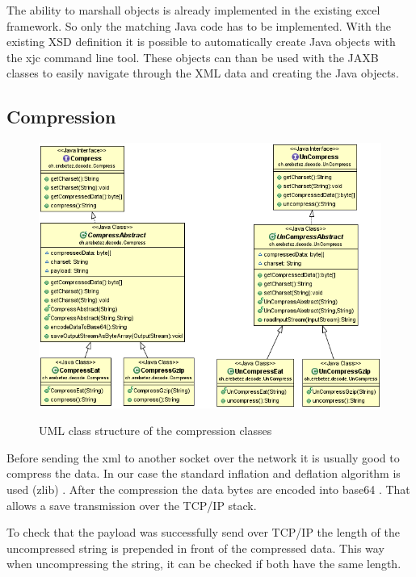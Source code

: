 \documentclass[paper=a4,twoside=false,BCOR=0mm,DIV=calc,fontsize=12pt]{scrartcl}
\begin{document}
The ability to marshall objects is already implemented in the existing excel framework. So only the matching Java code has to be implemented.
With the existing XSD definition it is possible to automatically create Java objects with the xjc \cite{xjc} command line tool.
These objects can than be used with the JAXB \cite{jaxb} classes to easily navigate through the XML data and creating the Java objects.



\subsection{Compression}
\begin{figure}
    \begin{center}
      \includegraphics[width=1\textwidth]{./img/uml_decode_model.png}\\
    \end{center}
  \caption{UML class structure of the compression classes}
  \label{compressionClassUml}
\end{figure} 

Before sending the xml to another socket over the network it is usually good to compress the data.
In our case the standard inflation and deflation algorithm is used (zlib) \cite{zlib}. After the compression 
the data bytes are encoded into base64 \cite{base64}. That allows a save transmission over the TCP/IP stack.

To check that the payload was successfully send over TCP/IP the length of the uncompressed string is prepended in front of the compressed data. This way when uncompressing the string, it can be checked if both have the same length. 
\end{document}
